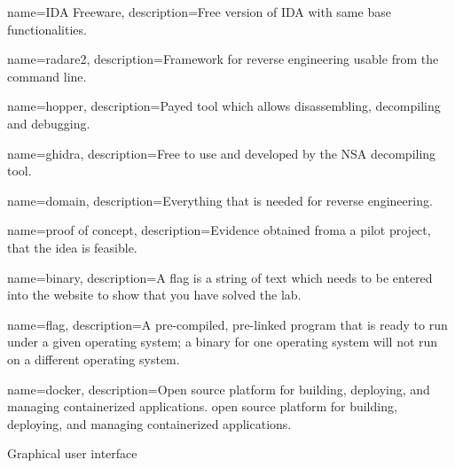 {
        name=IDA Freeware,
        description={Free version of IDA with same base functionalities.}
}

{
        name=radare2,
        description={Framework for reverse engineering usable from the command line.}
}

{
        name=hopper,
        description={Payed tool which allows disassembling, decompiling and debugging.}
}

{
        name=ghidra,
        description={Free to use and developed by the NSA decompiling tool.}
}

{
        name=domain,
        description={Everything that is needed for reverse engineering.}
}

{
        name=proof of concept,
        description={Evidence obtained froma a pilot project, that the idea is feasible.}
}

{
        name=binary,
        description={A flag is a string of text which needs to be entered into the website to show that you have solved the lab.}
}

{
        name=flag,
        description={A pre-compiled, pre-linked program that is ready to run under a given operating system; a binary for one operating system will not run on a different operating system.}
}

{
        name=docker,
        description={Open source platform for building, deploying, and managing containerized applications.}
}
open source platform for building, deploying, and managing containerized applications.

Graphical user interface
